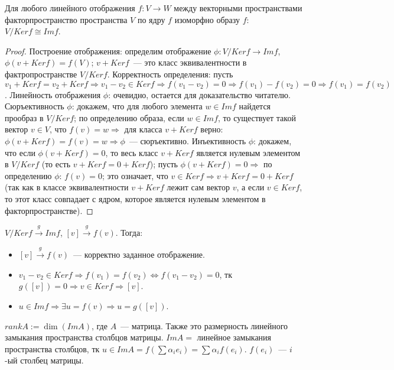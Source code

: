 \documentclass[12pt]{article}
\begin{document}
	\begin{theorem}
		Для любого линейного отображения $f: V \rightarrow W$ между векторными пространствами факторпространство пространства $V$ по ядру $f$ изоморфно образу $f$: $V / Ker f \cong Im f$.
	\end{theorem}
	\begin{proof}
		 Построение отображения: определим отображение $\phi: V / Ker f \rightarrow Im f$, $\phi (v + Ker f) = f(V)$; $v + Ker f$~--- это класс эквивалентности в фактропространстве $V / Ker f$. Корректность определения: пусть $v_1 + Ker f = v_2 + Ker f \Rightarrow v_1 - v_2 \in Ker f \Rightarrow f(v_1 - v_2) = 0 \Rightarrow f(v_1) - f(v_2) = 0 \Rightarrow f(v_1) = f(v_2)$. Линейность отображения $\phi$: очевидно, остается для доказательство читателю. Сюръективность $\phi$: докажем, что для любого элемента $w \in Im f$ найдется прообраз в $V / Ker f$; по определению образа, если $w \in Im f$, то существует такой вектор $v \in V$, что $f(v) = w \Rightarrow$ для класса $v + Ker f$ верно: $\phi (v + Ker f) = f(v) = w \Rightarrow \phi$~--- сюръективно. Инъективность $\phi$: докажем, что если $\phi (v + Ker f) = 0$, то весь класс $v + Ker f$ является нулевым элементом в $V / Ker f$ (то есть $v + Ker f = 0 + Ker f$); пусть $\phi (v + Ker f) = 0 \Rightarrow$ по определению $\phi$: $f(v) = 0$; это означает, что $v \in Ker f \Rightarrow v + Ker f = 0 + Ker f$ (так как в классе эквивалентности $v + Ker f$ лежит сам вектор $v$, а если $v \in Ker f$, то этот класс совпадает с ядром, которое является нулевым элементом в факторпространстве).
	\end{proof}
	\begin{statement}
		$V / Ker f \xrightarrow{g} Im f$, $[v] \xrightarrow{g} f(v)$. Тогда:
		\begin{itemize}
			\item $[v] \xrightarrow{g} f(v)$~--- корректно заданное отображение.
			\item $v_1 - v_2 \in Ker f \Rightarrow f(v_1) = f(v_2) \Leftrightarrow f(v_1 - v_2) = 0$, тк $g([v]) = 0 \Rightarrow v \in Ker f \Rightarrow [v]$.
			\item $u \in Im f \Rightarrow \exists u = f(v) \Rightarrow u = g([v])$.
		\end{itemize}
	\end{statement}
	\begin{definition}
		$rank A := \dim(Im A)$, где $A$~--- матрица. Также это размерность линейного замыкания пространства столбцов матрицы. $Im A = $ линейное замыкания пространства столбцов, тк $u \in Im A = f(\sum \alpha_i e_i) = \sum \alpha_i f(e_i)$. $f(e_i)$~--- $i$-ый столбец матрицы.
	\end{definition}
\end{document}
